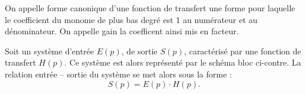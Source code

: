 

\begin{defi}
On appelle forme canonique d'une fonction de transfert une forme pour laquelle le coefficient du monome de plus bas degré est 1 au numérateur et au dénominateur. On appelle gain la coefficent ainsi mis en facteur.  
\end{defi}




\newpage
\clearpage

\begin{marginfigure}[1.5cm]
\centering
{} 
\end{marginfigure}

\begin{defi}

Soit un système d'entrée $E(p)$, de sortie $S(p)$, caractérisé par une fonction
de transfert $H(p)$. Ce système est alors représenté par le schéma bloc ci-contre.
La relation entrée -- sortie du système se met alors sous la forme : 
$$
S(p) = E(p) \cdot H(p).
$$
\end{defi}



\begin{marginfigure}[1cm]
\end{marginfigure}

